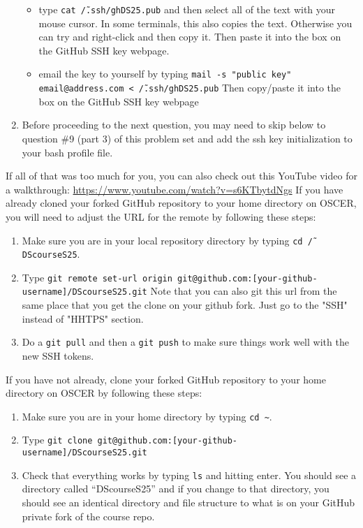 \documentclass[12pt,english]{exam}
\begin{document}
\begin{questions}
\begin{enumerate}
\begin{itemize}
        \item type \texttt{cat \~/.ssh/ghDS25.pub} and then select all of the text with your mouse cursor. In some terminals, this also copies the text. Otherwise you can try and right-click and then copy it. Then paste it into the box on the GitHub SSH key webpage.
        \item email the key to yourself by typing
        \texttt{mail -s "public key" email@address.com < \~/.ssh/ghDS25.pub}
        Then copy/paste it into the box on the GitHub SSH key webpage
    \end{itemize}
    \item Before proceeding to the next question, you may need to skip below to question \#9 (part 3) of this problem set and add the ssh key initialization to your bash profile file.
\end{enumerate}
    If all of that was too much for you, you can also check out this YouTube video for a walkthrough: \url{https://www.youtube.com/watch?v=s6KTbytdNgs}
\question If you have already cloned your forked GitHub repository to your home directory on OSCER, you will need to adjust the URL for the remote by following these steps:
\begin{enumerate}
    \item Make sure you are in your local repository directory by typing \texttt{cd \~/DScourseS25}.
    \item Type 
        \texttt{git remote set-url origin git@github.com:[your-github-username]/DScourseS25.git}
        Note that you can also git this url from the same place that you get the clone on your github fork. Just go to the "SSH" instead of "HHTPS" section.
    \item Do a \texttt{git pull} and then a \texttt{git push} to make sure things work well with the new SSH tokens.
\end{enumerate}
\question If you have not already, clone your forked GitHub repository to your home directory on OSCER by following these steps:
\begin{enumerate}
    \item Make sure you are in your home directory by typing \texttt{cd \~}.
    \item Type \texttt{git clone git@github.com:[your-github-username]/DScourseS25.git}
    \item Check that everything works by typing \texttt{ls} and hitting enter. You should see a directory called ``DScourseS25'' and if you change to that directory, you should see an identical directory and file structure to what is on your GitHub private fork of the course repo.

\end{enumerate}
\end{questions}
\end{document}
